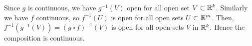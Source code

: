 
\begin{solution}
    Since $g$ is continuous, we have $g^{-1}(V)$ open for
  all open set $V\subset \mathbb{R}^k$. Similarly we have $f$
  continuous, so $f^{-1}(U)$ is open for all open sets
  $U\subset \mathbb{R}^m$. Then, $f^{-1}(g^{-1}(V))=
  (g\circ f)^{-1}(V)$ is open for all open sets $V$ in
  $\mathbb{R}^k$. Hence the composition is continuous.

\end{solution}
